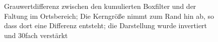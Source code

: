 \documentclass[a4paper,12pt]{article}
\begin{document}
\begin{figure}[htbp]
\caption{Grauwertdifferenz zwischen den kumulierten Boxfilter und der Faltung im
Ortsbereich; Die Kerngröße nimmt zum Rand hin ab, so dass dort eine Differenz
entsteht; die Darstellung wurde invertiert und 30fach verstärkt}%
\label{figure_hist_kumuBox}
\end{figure}
\end{document}
